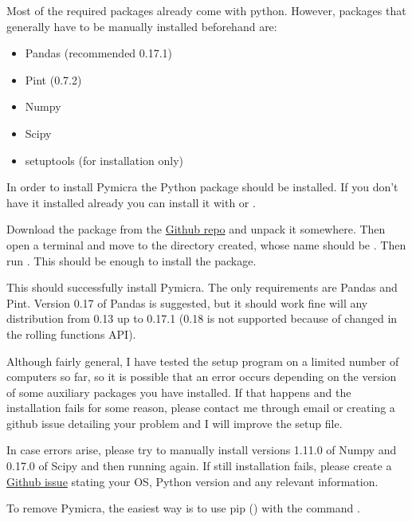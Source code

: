 \documentclass[a4paper,10pt,oneside]{sphinxmanual}
\begin{document}
Most of the required packages already come with python. However, packages that
generally have to be manually installed beforehand are:
\begin{itemize}
\item {} 
Pandas (recommended 0.17.1)

\item {} 
Pint (0.7.2)

\item {} 
Numpy

\item {} 
Scipy

\item {} 
setuptools (for installation only)

\end{itemize}

In order to install Pymicra the  Python package should be
installed. If you don't have it installed already you can install it with
 or .

Download the package from the \href{https://github.com/tomchor/pymicra}{Github repo} and unpack it somewhere. Then open a
terminal and move to the directory created, whose name should be .
Then run . This should be enough to install the
package.

This should successfully install Pymicra. The only
requirements are Pandas and Pint. Version 0.17 of Pandas is suggested, but it
should work fine will any distribution from 0.13 up to 0.17.1 (0.18 is not
supported because of changed in the rolling functions API).

Although fairly general, I have tested the setup program on a limited number of
computers so far, so it is possible that an error occurs depending on the
version of some auxiliary packages you have installed. If that happens and the
installation fails for some reason, please contact me through email or creating
a github issue detailing your problem and I will improve the setup file.

In case errors arise, please try to manually install versions 1.11.0 of Numpy
and 0.17.0 of Scipy and then running  again. If
still installation fails, please create a \href{https://github.com/tomchor/pymicra/issues}{Github issue} stating your OS, Python
version and any relevant information.

To remove Pymicra, the easiest way is to use pip
() with the command
.
\end{document}
